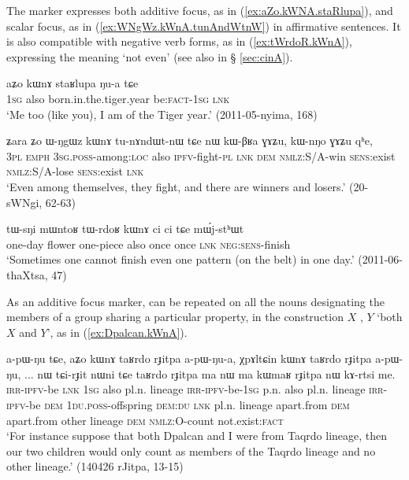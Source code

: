 The marker  expresses both additive focus, as in (\ref{ex:aZo.kWNA.staRlupa}), and scalar focus, as in (\ref{ex:WNgWz.kWnA.tunAndWtnW}) in affirmative sentences. It is also compatible with negative verb forms, as in (\ref{ex:tWrdoR.kWnA}), expressing the meaning `not even' (see also  in § \ref{sec:cinA}).

\begin{exe}
\ex \label{ex:aZo.kWNA.staRlupa}
\gll aʑo kɯnɤ staʁlupa ŋu-a tɕe \\
\textsc{1sg} also born.in.the.tiger.year be:\textsc{fact}-\textsc{1sg} \textsc{lnk} \\
\glt `Me too (like you), I am of the Tiger year.' (2011-05-nyima, 168)
\end{exe}

\begin{exe}
\ex \label{ex:WNgWz.kWnA.tunAndWtnW}
\gll ʑara ʑo ɯ-ŋgɯz kɯnɤ tu-nɤndɯt-nɯ tɕe nɯ kɯ-βʁa ɣɤʑu, kɯ-nŋo ɣɤʑu qʰe, \\
\textsc{3pl} \textsc{emph} \textsc{3sg}.\textsc{poss}-among:\textsc{loc} also \textsc{ipfv}-fight-\textsc{pl} \textsc{lnk} \textsc{dem} \textsc{nmlz}:S/A-win \textsc{sens}:exist \textsc{nmlz}:S/A-lose  \textsc{sens}:exist \textsc{lnk} \\
\glt `Even among themselves, they fight, and there are winners and losers.' (20-sWNgi, 62-63)
\end{exe}
 
\begin{exe}
\ex \label{ex:tWrdoR.kWnA}
\gll tɯ-sŋi mɯntoʁ tɯ-rdoʁ kɯnɤ ci ci tɕe mɯ́j-stʰɯt \\
one-day flower one-piece also once once \textsc{lnk} \textsc{neg}:\textsc{sens}-finish \\
\glt `Sometimes one cannot finish even one pattern (on the belt) in one day.' (2011-06-thaXtsa, 47)
\end{exe}

As an additive focus marker,  can be repeated on all the nouns designating the members of a group sharing a particular property, in the construction $X$ , $Y$   `both $X$ and $Y$', as in (\ref{ex:Dpalcan.kWnA}).

\begin{exe}
\ex \label{ex:Dpalcan.kWnA}
 \gll a-pɯ-ŋu tɕe, aʑo kɯnɤ taʁrdo rɟitpa a-pɯ-ŋu-a, χpɤltɕin kɯnɤ taʁrdo rɟitpa a-pɯ-ŋu, ... nɯ tɕi-rɟit nɯni tɕe taʁrdo rɟitpa ma nɯ ma kɯmaʁ rɟitpa nɯ kɤ-rtsi me.  \\
 \textsc{irr}-\textsc{ipfv}-be \textsc{lnk} \textsc{1sg} also pl.n. lineage  \textsc{irr}-\textsc{ipfv}-be-\textsc{1sg}  p.n. also pl.n. lineage  \textsc{irr}-\textsc{ipfv}-be { } \textsc{dem} \textsc{1du}.\textsc{poss}-offspring \textsc{dem}:\textsc{du} \textsc{lnk} pl.n. lineage apart.from \textsc{dem} apart.from other lineage \textsc{dem} \textsc{nmlz}:O-count not.exist:\textsc{fact} \\
 \glt `For instance suppose that both Dpalcan and I were from Taqrdo lineage, then our two children would only count as members of the Taqrdo lineage and no other lineage.' (140426 rJitpa, 13-15)
\end{exe}

